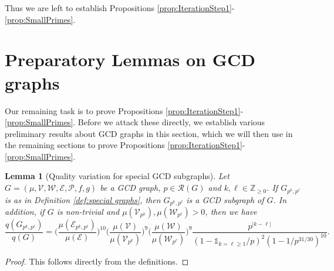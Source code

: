 \documentclass[12pt]{amsart}
\numberwithin{equation}{section}
\newtheorem{lem}{Lemma}[section]
\theoremstyle{definition}
\theoremstyle{remark}
\newcommand{\Z}{\mathbb{Z}}
\newcommand{\CE}{\mathcal{E}}
\newcommand{\CP}{\mathcal{P}}
\newcommand{\CR}{\mathcal{R}}
\newcommand{\CV}{\mathcal{V}}
\newcommand{\CW}{\mathcal{W}}
\newcommand{\un}{\mathds{1}}
\renewcommand{\ge}{\geqslant}
\begin{document}
Thus we are left to establish Propositions \ref{prop:IterationStep1}-\ref{prop:SmallPrimes}.

\section{Preparatory Lemmas on GCD graphs}\label{sec:Prep}

Our remaining task is to prove Propositions \ref{prop:IterationStep1}-\ref{prop:SmallPrimes}. Before we attack these directly, we establish various preliminary results about GCD graphs in this section, which we will then use in the remaining sections to prove Propositions \ref{prop:IterationStep1}-\ref{prop:SmallPrimes}.

\begin{lem}[Quality variation for special GCD subgraphs]\label{lem:InducedGraphs}
Let $G=(\mu,\CV,\CW,\CE,\CP,f,g)$ be a GCD graph, $p\in\CR(G)$ and $k,\ell\in\Z_{\ge0}$. If $G_{p^k,p^\ell}$ is as in Definition \ref{def:special graphs}, then $G_{p^k,p^\ell}$ is a GCD subgraph of $G$. In addition, if $G$ is non-trivial and $\mu(\CV_{p^k}),\mu(\CW_{p^\ell})>0$, then we have
\[
\frac{q(G_{p^k,p^\ell})}{q(G)}
	=\bigg(\frac{\mu(\CE_{p^k,p^\ell})}{\mu(\CE)}\bigg)^{10}
	 \bigg(\frac{\mu(\CV)}{\mu(\CV_{p^k})}\bigg)^{9}
	 \bigg(\frac{\mu(\CW)}{\mu(\CW_{p^\ell})}\bigg)^{9}
	 \frac{p^{|k-\ell|}}{(1-\un_{k=\ell\ge1}/p)^2(1-1/p^{31/30})^{10}}.
\]
\end{lem}
\begin{proof}
This follows directly from the definitions.
\end{proof}
\end{document}
